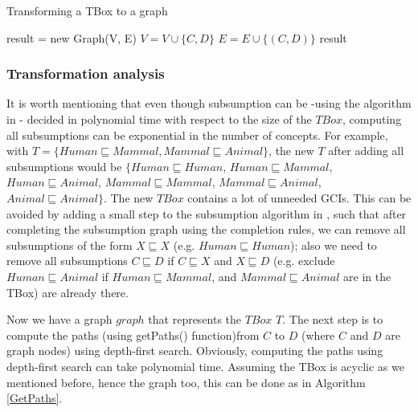 \begin{algorithm}
\caption{Transforming a TBox to a graph}
\label{Transformation}
\begin{algorithmic}[1]
\State result = new Graph(V, E)
\State $V = V \cup \{C, D\}$
\State $E = E \cup \{(C, D)\}$
\EndFor
\State \Return result
\EndFunction
\end{algorithmic}
\end{algorithm}

\subsubsection{Transformation analysis}
It is worth mentioning that even though subsumption can be -using the algorithm in \cite{small}- decided in polynomial time with respect to the size of the $TBox$, computing all subsumptions can be exponential in the number of concepts. For example, with $T = \{Human \sqsubseteq Mammal, Mammal \sqsubseteq Animal\}$, the new $T$ after adding all subsumptions would be $\{Human \sqsubseteq Human$, $Human \sqsubseteq Mammal$, $Human \sqsubseteq Animal$, $Mammal \sqsubseteq Mammal$, $Mammal \sqsubseteq Animal$, $Animal \sqsubseteq Animal\}$. The new $TBox$ contains a lot of unneeded GCIs. This can be avoided by adding a small step to the subsumption algorithm in \cite{small}, such that after completing the subsumption graph using the completion rules, we can remove all subsumptions of the form $X \sqsubseteq X$ (e.g. $Human \sqsubseteq Human$); also we need to remove all subsumptions $C \sqsubseteq D$ if $C \sqsubseteq X$ and $X \sqsubseteq D$ (e.g. exclude $Human \sqsubseteq Animal$ if $Human \sqsubseteq Mammal$, and $Mammal \sqsubseteq Animal$ are in the TBox) are already there.

Now we have a graph $graph$ that represents the $TBox$ $T$. The next step is to compute the paths (using getPaths() function)from $C$ to $D$ (where $C$ and $D$ are graph nodes) using depth-first search. Obviously, computing the paths using depth-first search can take polynomial time. Assuming the TBox is acyclic as we mentioned before, hence the graph too, this can be done as in Algorithm \ref{GetPaths}.

